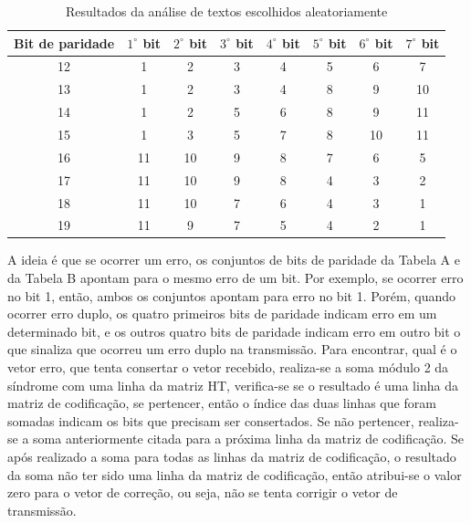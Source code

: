 \documentclass[journal,comsoc]{IEEEtran}
\begin{document}
		\begin{table} [h]
			\centering
			\renewcommand{\arraystretch}{1.3}
			\caption{Resultados da análise de textos escolhidos aleatoriamente}
			\label{tab:bits}
			\begin{tabular}{cccccccc}
				\hline
				Bit de paridade & $1^\circ$ bit & $2^\circ$ bit & $3^\circ$ bit & $4^\circ$ bit & $5^\circ$ bit & $6^\circ$ bit & $7^\circ$ bit \\
				\hline \hline
				12 & 1  & 2  & 3 & 4 & 5 & 6  & 7 \\
				13 & 1  & 2  & 3 & 4 & 8 & 9  & 10 \\
				14 & 1  & 2  & 5 & 6 & 8 & 9  & 11 \\
				15 & 1  & 3  & 5 & 7 & 8 & 10 & 11 \\
				16 & 11 & 10 & 9 & 8 & 7 & 6  & 5 \\
				17 & 11 & 10 & 9 & 8 & 4 & 3  & 2 \\
				18 & 11 & 10 & 7 & 6 & 4 & 3  & 1 \\
				19 & 11 & 9  & 7 & 5 & 4 & 2  & 1 \\
				\hline
			\end{tabular}
		\end{table}
	
		A ideia é que se ocorrer um erro, os conjuntos de bits de paridade da Tabela A e da Tabela B apontam para o mesmo erro de um bit. Por exemplo, se ocorrer erro no bit 1, então,	ambos os conjuntos apontam para erro no bit 1. Porém, quando ocorrer erro duplo, os quatro primeiros bits de paridade indicam erro em um determinado bit, e os outros quatro bits de paridade indicam erro em outro bit o que sinaliza que ocorreu um erro duplo na transmissão. Para encontrar, qual é o vetor erro, que tenta consertar o vetor recebido, realiza-se a soma módulo 2 da síndrome com uma linha da matriz HT, verifica-se se o resultado é uma linha da matriz de codificação, se pertencer, então o índice das duas linhas que foram somadas indicam os bits que precisam ser consertados. Se não pertencer, realiza-se a soma anteriormente citada para a próxima linha da matriz de codificação. Se após realizado a soma para todas as linhas da matriz de codificação, o resultado da soma não ter sido uma linha da matriz de codificação, então atribui-se o valor zero para o vetor de correção, ou seja, não se tenta corrigir o vetor de transmissão.
	
\end{document}
